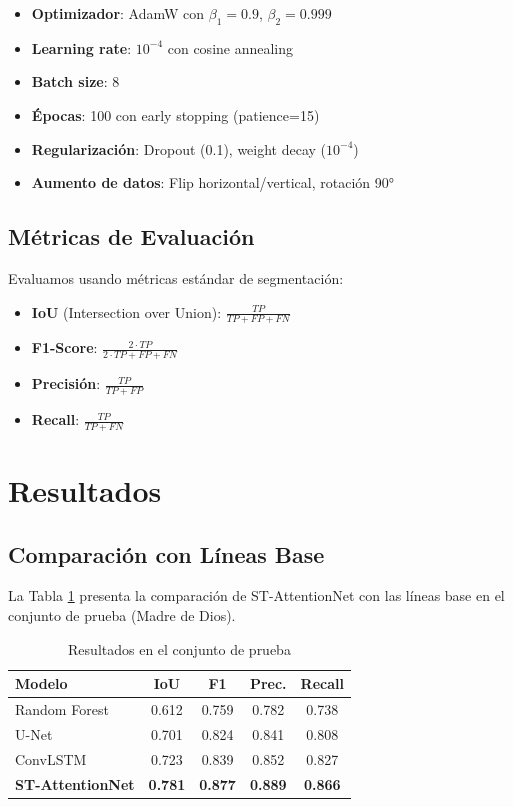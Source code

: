 \documentclass[conference]{IEEEtran}
\begin{document}
\begin{itemize}
    \item \textbf{Optimizador}: AdamW con $\beta_1=0.9$, $\beta_2=0.999$
    \item \textbf{Learning rate}: $10^{-4}$ con cosine annealing
    \item \textbf{Batch size}: 8
    \item \textbf{Épocas}: 100 con early stopping (patience=15)
    \item \textbf{Regularización}: Dropout (0.1), weight decay ($10^{-4}$)
    \item \textbf{Aumento de datos}: Flip horizontal/vertical, rotación 90°
\end{itemize}

\subsection{Métricas de Evaluación}

Evaluamos usando métricas estándar de segmentación:
\begin{itemize}
    \item \textbf{IoU} (Intersection over Union): $\frac{TP}{TP + FP + FN}$
    \item \textbf{F1-Score}: $\frac{2 \cdot TP}{2 \cdot TP + FP + FN}$
    \item \textbf{Precisión}: $\frac{TP}{TP + FP}$
    \item \textbf{Recall}: $\frac{TP}{TP + FN}$
\end{itemize}

\section{Resultados}

\subsection{Comparación con Líneas Base}

La Tabla \ref{tab:results} presenta la comparación de ST-AttentionNet con las líneas base en el conjunto de prueba (Madre de Dios).

\begin{table}[h]
\centering
\caption{Resultados en el conjunto de prueba}
\label{tab:results}
\begin{tabular}{lcccc}
\toprule
\textbf{Modelo} & \textbf{IoU} & \textbf{F1} & \textbf{Prec.} & \textbf{Recall} \\
\midrule
Random Forest & 0.612 & 0.759 & 0.782 & 0.738 \\
U-Net & 0.701 & 0.824 & 0.841 & 0.808 \\
ConvLSTM & 0.723 & 0.839 & 0.852 & 0.827 \\
\textbf{ST-AttentionNet} & \textbf{0.781} & \textbf{0.877} & \textbf{0.889} & \textbf{0.866} \\
\bottomrule
\end{tabular}
\end{table}
\end{document}
